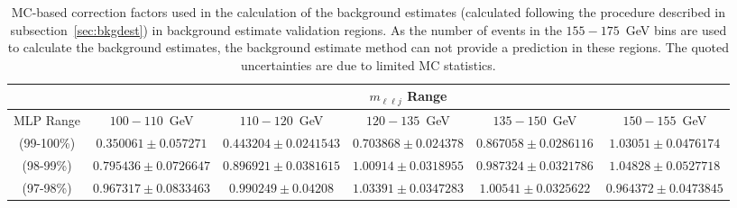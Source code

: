 \documentclass[NOTE, atlasdraft=true, texlive=2017, UKenglish]{\ATLASLATEXPATH atlasdoc}
\begin{document}
\begin{table}[!htbp]{\footnotesize\renewcommand{\arraystretch}{1.2}
    \begin{center}
      \begin{tabular}{c|c|c|c|c|c|}
        \cline{2-6}
        & \multicolumn{5}{|c|}{$m_{\ell\ell j}$ Range}\\
        \hline
        \multicolumn{1}{|c|}{MLP Range} & $100-110$~GeV & $110-120$~GeV & $120-135$~GeV & $135-150$~GeV & $150-155$~GeV \\
        \hline
        \multicolumn{1}{|c|}{(99-100\%)} & $\num[round-mode=figures,round-precision=3]{0.350061} \pm \num[round-mode=figures,round-precision=3]{0.057271}$ & $\num[round-mode=figures,round-precision=3]{0.443204} \pm \num[round-mode=figures,round-precision=3]{0.0241543}$ & $\num[round-mode=figures,round-precision=3]{0.703868} \pm \num[round-mode=figures,round-precision=3]{0.024378}$ & $\num[round-mode=figures,round-precision=3]{0.867058} \pm \num[round-mode=figures,round-precision=3]{0.0286116}$ & $\num[round-mode=figures,round-precision=3]{1.03051} \pm \num[round-mode=figures,round-precision=3]{0.0476174}$ \\
        \multicolumn{1}{|c|}{(98-99\%)} & $\num[round-mode=figures,round-precision=3]{0.795436} \pm \num[round-mode=figures,round-precision=3]{0.0726647}$ & $\num[round-mode=figures,round-precision=3]{0.896921} \pm \num[round-mode=figures,round-precision=3]{0.0381615}$ & $\num[round-mode=figures,round-precision=3]{1.00914} \pm \num[round-mode=figures,round-precision=3]{0.0318955}$ & $\num[round-mode=figures,round-precision=3]{0.987324} \pm \num[round-mode=figures,round-precision=3]{0.0321786}$ & $\num[round-mode=figures,round-precision=3]{1.04828} \pm \num[round-mode=figures,round-precision=3]{0.0527718}$ \\
        \multicolumn{1}{|c|}{(97-98\%)} & $\num[round-mode=figures,round-precision=3]{0.967317} \pm \num[round-mode=figures,round-precision=3]{0.0833463}$ & $\num[round-mode=figures,round-precision=3]{0.990249} \pm \num[round-mode=figures,round-precision=3]{0.04208}$ & $\num[round-mode=figures,round-precision=3]{1.03391} \pm \num[round-mode=figures,round-precision=3]{0.0347283}$ & $\num[round-mode=figures,round-precision=3]{1.00541} \pm \num[round-mode=figures,round-precision=3]{0.0325622}$ & $\num[round-mode=figures,round-precision=3]{0.964372} \pm \num[round-mode=figures,round-precision=3]{0.0473845}$ \\
        \hline
      \end{tabular}
      \caption{MC-based correction factors used in the calculation of the background estimates (calculated following the procedure described in subsection~\ref{sec:bkgdest}) in background estimate validation regions. As the number of events in the $155-175$~GeV bins are used to calculate the background estimates, the background estimate method can not provide a prediction in these regions. The quoted uncertainties are due to limited MC statistics.}
      \label{tab:correctionfactors}
  \end{center}}
\end{table}
\end{document}
